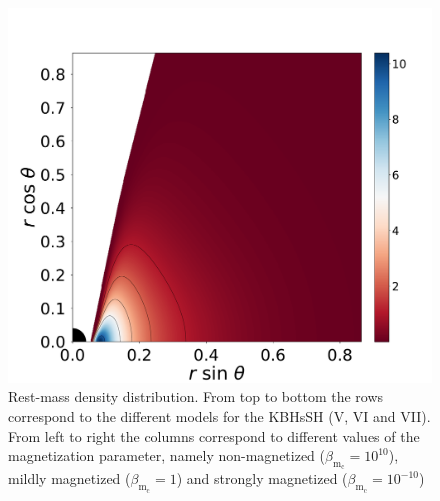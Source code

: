 \documentclass[twocolumn,aps,showpacs,showkeys,prd,superscriptaddress,byrevtex, amsmath]{revtex4-1}
\begin{document}
\begin{figure}
\includegraphics[scale=0.14]{figures/fig2_VII__10.pdf}
\hspace{-0.2cm}
\caption{Rest-mass density distribution. From top to bottom the rows correspond to the different models for the KBHsSH (V, VI and VII). From left to right the columns correspond to different values of the magnetization parameter, namely non-magnetized ($\beta_{\mathrm{m}_{\mathrm{c}}} = 10^{10}$), mildly magnetized ($\beta_{\mathrm{m}_{\mathrm{c}}} = 1$) and strongly magnetized ($\beta_{\mathrm{m}_{\mathrm{c}}} = 10^{-10}$)}
\label{models_II}
\end{figure}
\end{document}
